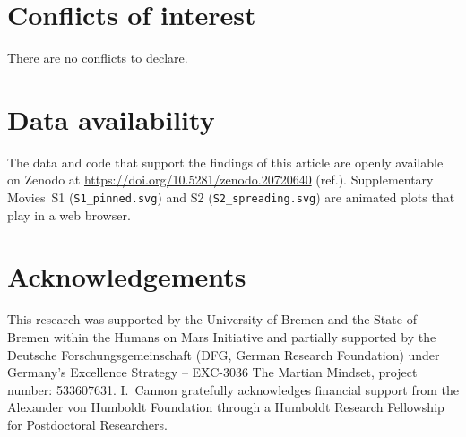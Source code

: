 \documentclass[9pt]{extarticle}
\begin{document}
\section*{Conflicts of interest}

There are no conflicts to declare.

\section*{Data availability}

The data and code that support the findings of this article are openly available on Zenodo at \url{https://doi.org/10.5281/zenodo.20720640} (ref.). Supplementary Movies~S1 (\texttt{S1\_pinned.svg}) and S2 (\texttt{S2\_spreading.svg}) are animated plots that play in a web browser.

\section*{Acknowledgements}

This research was supported by the University of Bremen and the State of Bremen within the Humans on Mars Initiative and partially supported by the Deutsche Forschungsgemeinschaft (DFG, German Research Foundation) under Germany's Excellence Strategy – EXC-3036 The Martian Mindset, project number: 533607631. I.~Cannon gratefully acknowledges financial support from the Alexander von Humboldt Foundation through a Humboldt Research Fellowship for Postdoctoral Researchers.


\end{document}
